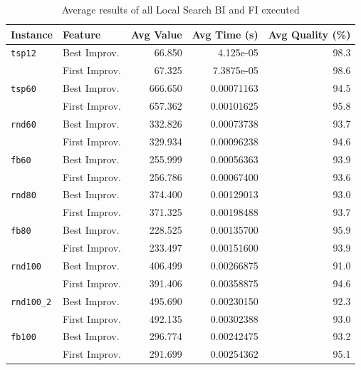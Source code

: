 	\begin{table}[H]
		
		\begin{tabular}{llrrr}
			\toprule
			\textbf{Instance} & \textbf{Feature} & \textbf{Avg Value} & \textbf{Avg Time (s)} & \textbf{Avg Quality} (\%) \\
			\midrule
			\verb|tsp12| 	& Best Improv. & 66.850 & 4.125e-05 & 98.3 \\
			& First Improv. & 67.325 & 7.3875e-05 & 98.6 \\
			\midrule
			\verb|tsp60| 	& Best Improv. & 666.650 & 0.00071163 & 94.5 \\
			& First Improv. & 657.362 & 0.00101625 & 95.8 \\
			\midrule
			\verb|rnd60| 	& Best Improv. & 332.826 & 0.00073738 & 93.7 \\
							& First Improv. & 329.934 & 0.00096238 & 94.6 \\
			\midrule
			\verb|fb60|		& Best Improv. & 255.999 & 0.00056363 & 93.9 \\
							& First Improv. & 256.786 & 0.00067400 & 93.6 \\ 
			\midrule
			\verb|rnd80| 	& Best Improv. & 374.400 & 0.00129013 & 93.0 \\
							& First Improv. & 371.325 & 0.00198488 & 93.7 \\
			\midrule
			\verb|fb80|		& Best Improv. & 228.525 & 0.00135700 & 95.9 \\
							& First Improv. & 233.497 & 0.00151600 &  93.9 \\
			\midrule
			\verb|rnd100| 	& Best Improv. & 406.499 & 0.00266875 & 91.0 \\
							& First Improv. & 391.406 & 0.00358875 & 94.6 \\
			\midrule
			\verb|rnd100_2| & Best Improv. & 495.690 & 0.00230150 & 92.3 \\
							& First Improv. & 492.135 & 0.00302388 & 93.0 \\
			\midrule
			\verb|fb100| & Best Improv. & 296.774 & 0.00242475 & 93.2 \\
						& First Improv. & 291.699 & 0.00254362 & 95.1 \\
			\bottomrule
		\end{tabular}
		\caption{\label{tab:AvgResultLS}Average results of all Local Search BI and FI executed}
	\end{table}
	
